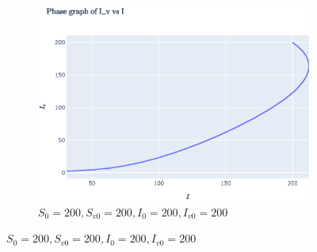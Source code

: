 \documentclass[11pt]{article}
\begin{document}
\begin{figure}[th]
	\begin{subfigure}{0.49\textwidth}
	  \centering
	  \includegraphics[width=\linewidth]{../figures/ex2_IvI_1.eps}  
	  \caption{$S_0 = 200, S_{v0} = 200,I_0 = 200, I_{v0} = 200$}
	  

\end{subfigure}
\end{figure}
\end{document}
